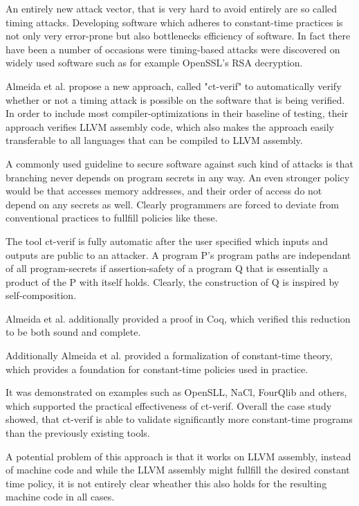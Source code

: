 \documentclass[a4paper,UKenglish]{lipics-v2018}
\begin{document}
An entirely new attack vector, that is very hard to avoid entirely are so called timing attacks. Developing software which adheres to constant-time practices is not only very error-prone but also bottlenecks efficiency of software. In fact there have been a number of occasions were timing-based attacks were discovered on widely used software such as for example OpenSSL's RSA decryption.


Almeida et al. propose a new approach, called "ct-verif" to automatically verify whether  or not a timing attack is possible on the software that is being verified. In order to include most compiler-optimizations in their baseline of testing, their approach verifies LLVM assembly code, which also makes the approach easily transferable to all languages that can be compiled to LLVM assembly.\cite{verifying_constant_time_implementations}

A commonly used guideline to secure software against such kind of attacks is that branching never depends on program secrets in any way. An even stronger policy would be that accesses memory addresses, and their order of access do not depend on any secrets as well. Clearly programmers are forced to deviate from conventional practices to fullfill policies like these.\cite{verifying_constant_time_implementations}

The tool ct-verif is fully automatic after the user specified which inputs and outputs are public to an attacker. A program P's program paths are independant of all program-secrets if assertion-safety of a program Q that is essentially a product of the P with itself holds.\cite{verifying_constant_time_implementations} Clearly, the construction of Q is inspired by self-composition. 

Almeida et al. additionally provided a proof in Coq, which verified this reduction to be both sound and complete.\cite{verifying_constant_time_implementations}

Additionally Almeida et al. provided a formalization of constant-time theory, which provides a foundation for constant-time policies used in practice.

It was demonstrated on examples such as OpenSLL, NaCl, FourQlib and others, which supported the practical effectiveness of ct-verif. Overall the case study showed, that ct-verif is able to validate significantly more constant-time programs than the previously existing tools.\cite{verifying_constant_time_implementations}

A potential problem of this approach is that it works on LLVM assembly, instead of machine code and while the LLVM assembly might fullfill the desired constant time policy, it is not entirely clear wheather this also holds for the resulting machine code in all cases.\cite{verifying_constant_time_implementations}



\newpage

\end{document}
